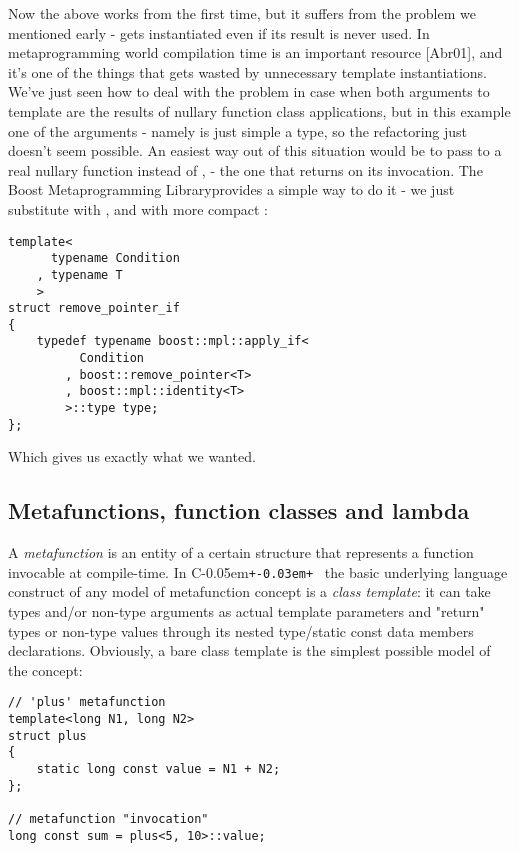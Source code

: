 \documentclass{netobjectdays}
\newcommand{\Cpp}{C\kern-0.05em\texttt{+\kern-0.03em+}%
}
\newcommand{\Mpl}{Boost Meta\-program\-ming Library}
\begin{document}
Now the above works from the first time, but it suffers from the 
problem we mentioned early -  gets 
instantiated even if its result is never used. In metaprogramming 
world compilation time is an important resource [Abr01], and it's 
one of the things that gets wasted by unnecessary template 
instantiations. We've just seen how to deal with the problem in 
case when both arguments to  template are the 
results of nullary function class applications, but in this example 
one of the arguments - namely  is just simple a type, so 
the refactoring just doesn't seem possible. An easiest way out of 
this situation would be to pass to  a real 
nullary function instead of , - the one that returns 
 on its invocation. The \Mpl provides a simple way to do it -
we just substitute  with ,
and  with more compact 
:

{\footnotesize
\begin{verbatim}
template<
      typename Condition
    , typename T
    >
struct remove_pointer_if
{
    typedef typename boost::mpl::apply_if<
          Condition
        , boost::remove_pointer<T>
        , boost::mpl::identity<T>
        >::type type;
};
\end{verbatim}
}

Which gives us exactly what we wanted.


\subsection{Metafunctions, function classes and lambda}


A \emph{metafunction} is an entity of a certain structure that
represents a function invocable at compile-time.  In \Cpp\, the basic
underlying language construct of any model of metafunction concept is
a \emph{class template}: it can take types and/or non-type arguments
as actual template parameters and "return" types or non-type values
through its nested type/static const data members
declarations. Obviously, a bare class template is the simplest
possible model of the concept:

{\footnotesize
\begin{verbatim}
// 'plus' metafunction
template<long N1, long N2>
struct plus
{
    static long const value = N1 + N2;
};

// metafunction "invocation"
long const sum = plus<5, 10>::value;
\end{verbatim}
}
\end{document}
